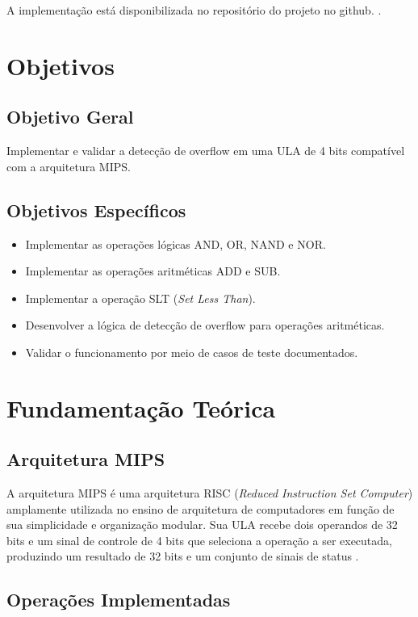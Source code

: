 \documentclass[a4paper,12pt]{article}
\begin{document}
A implementação está disponibilizada no repositório do projeto no github. \cite{githubrepo}.

\section{Objetivos}

\subsection{Objetivo Geral}

Implementar e validar a detecção de overflow em uma ULA de 4 bits compatível com
a arquitetura MIPS.

\subsection{Objetivos Específicos}

\begin{itemize}
    \item Implementar as operações lógicas AND, OR, NAND e NOR.
    \item Implementar as operações aritméticas ADD e SUB.
    \item Implementar a operação SLT (\textit{Set Less Than}).
    \item Desenvolver a lógica de detecção de overflow para operações aritméticas.
    \item Validar o funcionamento por meio de casos de teste documentados.
\end{itemize}

\section{Fundamentação Teórica}

\subsection{Arquitetura MIPS}

A arquitetura MIPS é uma arquitetura RISC (\textit{Reduced Instruction Set
Computer}) amplamente utilizada no ensino de arquitetura de computadores em função
de sua simplicidade e organização modular. Sua ULA recebe dois operandos de 32 bits
e um sinal de controle de 4 bits que seleciona a operação a ser executada,
produzindo um resultado de 32 bits e um conjunto de sinais de status
\cite{patterson2017}.

\subsection{Operações Implementadas}
\end{document}
